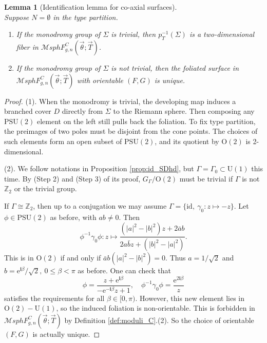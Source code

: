 \documentclass[pdflatex,sn-mathphys]{sn-jnl}%
\numberwithin{equation}{section}
\theoremstyle{thmstyleone}%
\newtheorem{lemma}[theorem]{Lemma}
\newcommand{\ZZ}{\mathbb{Z}}
\newcommand{\ii}{\mathbf{i}}
\newcommand{\abs}[1]{\left\lvert #1 \right\rvert}
\newcommand{\PSUtwo}{\mathrm{PSU}(2)}
\newcommand{\Uone}{\mathrm{U}(1)}
\newcommand{\Otwo}{\mathrm{O}(2)}
\newcommand{\MsphgnCFT}{\mathcal{M}sphF_{g,n}^C(\vec{\theta};\vec{T})}
\begin{document}
\begin{lemma}[Identification lemma for co-axial surfaces]\label{prop:id_CoAx} ~ \\
Suppose $N=\emptyset$ in the type partition.
    \begin{enumerate}
    \item If the monodromy group of $\Sigma$ is trivial, then $p_T^{-1}(\Sigma)$ is a two-dimensional fiber in $\MsphgnCFT$.
    \item If the monodromy group of $\Sigma$ is not trivial, then the foliated surface in $\MsphgnCFT$ with orientable $(F,G)$ is unique.
    \end{enumerate}
\end{lemma}
\begin{proof}
    (1). When the monodromy is trivial, the developing map induces a branched cover $D$ directly from $\Sigma$ to the Riemann sphere. Then composing any $\PSUtwo$ element on the left still pulls back the foliation. To fix type partition, the preimages of two poles must be disjoint from the cone points. %
    The choices of such elements form an open subset of $\PSUtwo$, and its quotient by $\Otwo$ is 2-dimensional.

    \medskip
    (2). We follow notations in Proposition \ref{prop:id_SDhd}, but $\Gamma=\Gamma_0\subset\Uone$ this time. By (Step 2) and (Step 3) of its proof, $G_\Gamma/\Otwo$ must be trivial if $\Gamma$ is not $\ZZ_2$ or the trivial group.

    If $\Gamma\cong \ZZ_2$, then up to a conjugation we may assume $\Gamma=\{\mathrm{id},\ \gamma_0:z\mapsto -z\}$. Let $\phi\in\PSUtwo$ as before, with $ab\neq0$. Then
    $$ \phi^{-1}\gamma_0\phi: z \mapsto \frac {(\abs{a}^2-\abs{b}^2)z + 2\bar{a}b} {2a\bar{b}z + (\abs{b}^2-\abs{a}^2)}. $$
    This is in $\Otwo$ if and only if $\bar{a}b(\abs{a}^2-\abs{b}^2)=0$. Thus $a=1/\sqrt{2}$ and $b=\mathrm{e}^{\ii\beta}/\sqrt{2},\ 0\leqslant \beta < \pi$ as before. One can check that
    $$ \phi=\frac{z+\mathrm{e}^{\ii\beta}}{-\mathrm{e}^{-\ii\beta}z+1},\quad  \phi^{-1}\gamma_0\phi=\frac{\mathrm{e}^{2\ii\beta}}{z}$$
    satisfies the requirements for all $\beta\in[0,\pi)$. %
    However, this new element lies in 
    $\Otwo-\Uone$, so the induced foliation is non-orientable. This is forbidden in $\MsphgnCFT$ by Definition \ref{def:moduli_C}.(2). So the choice of orientable $(F,G)$ is actually unique.
\end{proof}
\end{document}
